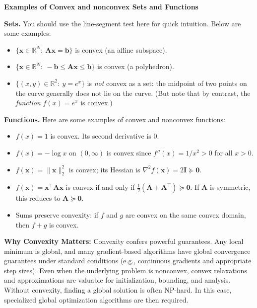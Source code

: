 \begin{exampleBox}
    \textbf{Examples of Convex and nonconvex Sets and Functions}

    \textbf{Sets.} You should use the line-segment test here for quick intuition. Below are some examples:
    \begin{itemize}
        \item \(\{\mathbf{x}\in\mathbb{R}^N:\ \mathbf{A}\mathbf{x}=\mathbf{b}\}\) is convex (an affine subspace).
        \item \(\{\mathbf{x}\in\mathbb{R}^N:\ -\mathbf{b}\le \mathbf{A}\mathbf{x}\le \mathbf{b}\}\) is convex (a polyhedron).
        \item \(\{(x,y)\in\mathbb{R}^2:\ y=e^{x}\}\) is \emph{not} convex as a set: the midpoint of two points on the curve generally does not lie on the curve. (But note that by contrast, the \emph{function} $f(x) = e^{x}$ is convex.)
    \end{itemize}

    \textbf{Functions.} Here are some examples of convex and nonconvex functions:
    \begin{itemize}
        \item \(f(x)=1\) is convex. Its second derivative is \(0\).
        \item \(f(x)=-\log x\) on \((0,\infty)\) is convex since \(f''(x)=1/x^{2}>0\) for all \(x > 0\).
        \item \(f(\mathbf{x})=\|\mathbf{x}\|_2^2\) is convex; its Hessian is \(\nabla^2 f(\mathbf{x})=2\mathbf{I}\succeq \mathbf{0}\).
        \item \(f(\mathbf{x})=\mathbf{x}^\top \mathbf{A}\mathbf{x}\) is convex if and only if \(\frac{1}{2}\left(\mathbf{A}+\mathbf{A}^\top\right)\succeq \mathbf{0}\). If $\mathbf{A}$ is symmetric, this reduces to $\mathbf{A}\succeq \mathbf{0}$. 
        \item Sums preserve convexity: if \(f\) and \(g\) are convex on the same convex domain, then \(f+g\) is convex.
    \end{itemize}
    \end{exampleBox}

\textbf{Why Convexity Matters:} Convexity confers powerful guarantees. Any local minimum is global, and many gradient-based algorithms have global convergence guarantees under standard conditions (e.g., continuous gradients and appropriate step sizes). Even when the underlying problem is nonconvex, convex relaxations and approximations are valuable for initialization, bounding, and analysis. Without convexity, finding a global solution is often NP-hard. In this case, specialized global optimization algorithms are then required.

